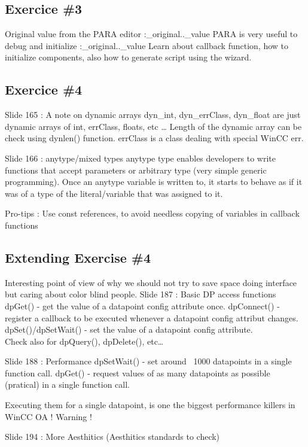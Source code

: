 \documentclass[a4paper, 10pt]{article}
\begin{document}
\subsection{Exercice \#3}
Original value from the PARA editor :\_original..\_value
PARA is very useful to debug and initialize :\_original..\_value
Learn about callback function, how to initialize components, also how to generate script using the wizard.

\subsection{Exercice \#4}

Slide 165 : A note on dynamic arrays
dyn\_int, dyn\_errClass, dyn\_float are just dynamic arrays of int, errClass, floats, etc \dots 
Length of the dynamic array can be check using dynlen() function.
errClass is a class dealing with special WinCC err.

Slide 166 : anytype/mixed types
anytype type enables developers to write functions that accept parameters or arbitrary type (very simple generic programming). Once an anytype variable is written to, it starts to behave as if it was of a type of the literal/variable that was assigned to it.

Pro-tips : Use const references, to avoid needless copying of variables in callback functions

\subsection{Extending Exercise \#4}
Interesting point of view of why we should not try to save space doing interface but caring about color blind people. Slide 187 : Basic DP access functions
dpGet() - get the value of a datapoint config attribute once.
dpConnect() - register a callback to be executed whenever a datapoint config attribut changes.
dpSet()/dpSetWait() - set the value of a datapoint config attribute.\\

Check also for dpQuery(), dpDelete(), etc\dots

Slide 188 : Performance
dpSetWait() - set around ~1000 datapoints in a single function call.
dpGet() - request values of as many datapoints as possible (pratical) in a single function call.

Executing them for a single datapoint, is one the biggest performance killers in WinCC OA ! Warning !

Slide 194 : More Aesthitics (Aesthitics standards to check)
\end{document}
